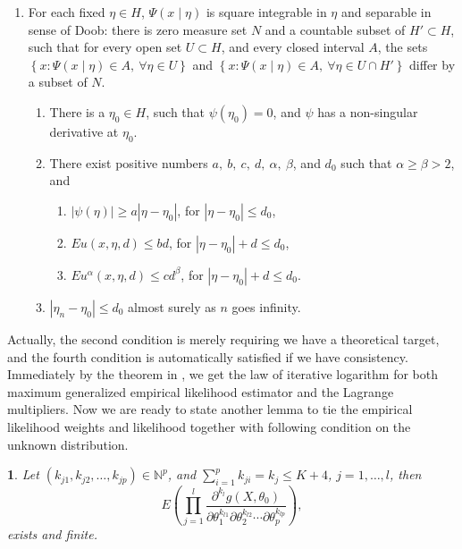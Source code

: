 \documentclass[oneside,english]{amsbook}
\numberwithin{section}{chapter}
\numberwithin{equation}{section}
\numberwithin{figure}{section}
\theoremstyle{plain}
\theoremstyle{plain}
\newtheorem{assumption}{\protect\assumptionname}
\theoremstyle{definition}
\theoremstyle{plain}
\theoremstyle{plain}
\theoremstyle{remark}
\theoremstyle{definition}
\theoremstyle{definition}
\providecommand{\assumptionname}{Assumption}
\begin{document}
\begin{enumerate}
\item For each fixed $\eta\in H$, $\Psi\left(x\mid\eta\right)$ is square
integrable in $\eta$ and separable in sense of Doob: there is zero
measure set $N$ and a countable subset of $H'\subset H$, such that
for every open set $U\subset H$, and every closed interval $A$,
the sets $\left\{ x:\Psi\left(x\mid\eta\right)\in A,\:\forall\eta\in U\right\} $
and $\left\{ x:\Psi\left(x\mid\eta\right)\in A,\:\forall\eta\in U\cap H'\right\} $
differ by a subset of $N$.

\begin{enumerate}
\item There is a $\eta_{0}\in H$, such that $\psi\left(\eta_{0}\right)=0$,
and $\psi$ has a non-singular derivative at $\eta_{0}$.
\item There exist positive numbers $a,\: b,\: c,\: d,\:\alpha,\:\beta$,
and $d_{0}$ such that $\alpha\ge\beta>2$, and 

\begin{enumerate}
\item $\left|\psi\left(\eta\right)\right|\ge a\left|\eta-\eta_{0}\right|$,
for $\left|\eta-\eta_{0}\right|\le d_{0}$,
\item $Eu\left(x,\eta,d\right)\le bd$, for $\left|\eta-\eta_{0}\right|+d\le d_{0}$,
\item $Eu^{\alpha}\left(x,\eta,d\right)\le cd^{\beta}$, for $\left|\eta-\eta_{0}\right|+d\le d_{0}$.
\end{enumerate}
\item $\left|\eta_{n}-\eta_{0}\right|\le d_{0}$ almost surely as $n$ goes
infinity.
\end{enumerate}
\end{enumerate}
Actually, the second condition is merely requiring we have a theoretical
target, and the fourth condition is automatically satisfied if we
have consistency. Immediately by the theorem in \citet{he1995law},
we get the law of iterative logarithm for both maximum generalized
empirical likelihood estimator and the Lagrange multipliers. Now we
are ready to state another lemma to tie the empirical likelihood weights
and likelihood together with following condition on the unknown distribution.
\begin{assumption}
\label{assu:finite-theoretic-moment} Let $\left(k_{j1},k_{j2},\ldots,k_{jp}\right)\in\mathbb{N}^{p}$,
and $\sum_{i=1}^{p}k_{ji}=k_{j}\le K+4$, $j=1,\ldots,l$, then 
\[
E\left(\prod_{j=1}^{l}\frac{\partial^{k_{l}}g\left(X,\theta_{0}\right)}{\partial\theta_{1}^{k_{l1}}\partial\theta_{2}^{k_{l2}}\cdots\partial\theta_{p}^{k_{lp}}}\right),
\]
exists and finite.\end{assumption}
\end{document}
